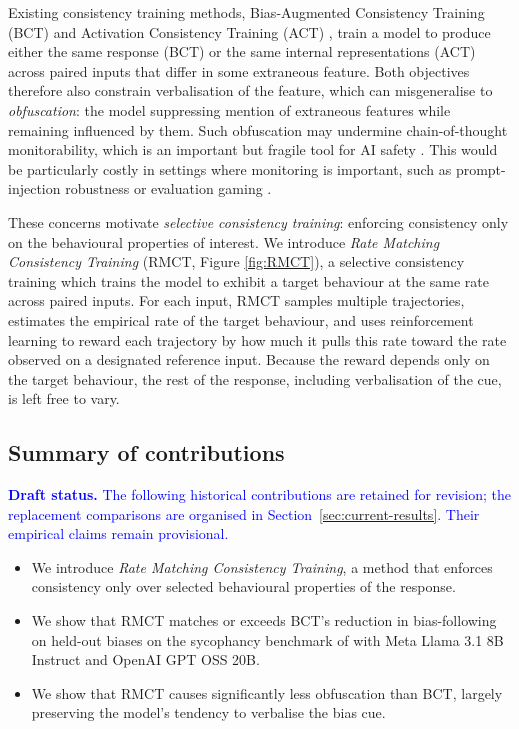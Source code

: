 \documentclass{article}
\begin{document}
Existing consistency training methods, Bias-Augmented Consistency Training (BCT) \citep{chua_bias-augmented_2024} and Activation Consistency Training (ACT) \citep{irpan_consistency_2025}, train a model to produce either the same response (BCT) or the same internal representations (ACT) across paired inputs that differ in some extraneous feature. Both objectives therefore also constrain verbalisation of the feature, which can misgeneralise to \emph{obfuscation}: the model suppressing mention of extraneous features while remaining influenced by them. Such obfuscation may undermine chain-of-thought monitorability, which is an important but fragile tool for AI safety \citep{korbak2025chain}. This would be particularly costly in settings where monitoring is important, such as prompt-injection robustness \citep{anthropic_prompt_injection_2025} or evaluation gaming \citep{schoen_stress_2025}.

These concerns motivate \emph{selective consistency training}: enforcing consistency only on the behavioural properties of interest. We introduce \emph{Rate Matching Consistency Training} (RMCT, Figure \ref{fig:RMCT}), a selective consistency training which trains the model to exhibit a target behaviour at the same rate across paired inputs. For each input, RMCT samples multiple trajectories, estimates the empirical rate of the target behaviour, and uses reinforcement learning to reward each trajectory by how much it pulls this rate toward the rate observed on a designated reference input. Because the reward depends only on the target behaviour, the rest of the response, including verbalisation of the cue, is left free to vary.

\subsection{Summary of contributions}
\textcolor{blue}{\textbf{Draft status.} The following historical contributions are retained for revision; the replacement comparisons are organised in Section~\ref{sec:current-results}. Their empirical claims remain provisional.}
\begin{itemize}
    \item We introduce \emph{Rate Matching Consistency Training}, a method that enforces consistency only over selected behavioural properties of the response.
    \item We show that RMCT matches or exceeds BCT's reduction in bias-following on held-out biases on the sycophancy benchmark of \citet{chua_bias-augmented_2024} with Meta Llama 3.1 8B Instruct and OpenAI GPT OSS 20B.
    \item We show that RMCT causes significantly less obfuscation than BCT, largely preserving the model's tendency to verbalise the bias cue.
\end{itemize}
\end{document}

